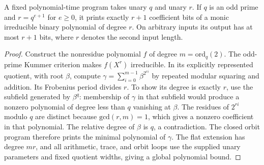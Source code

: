 \begin{lemma}
\label{lem:binary-odd-prime-power-irreducible}
\leanok
A fixed polynomial-time program takes unary $q$ and unary $r$. If $q$ is an odd
prime and $r=q^{e+1}$ for $e\geq 0$, it prints exactly $r+1$ coefficient bits
of a monic irreducible binary polynomial of degree $r$. On arbitrary inputs its
output has at most $r+1$ bits, where $r$ denotes the second input length.
\end{lemma}
\begin{proof}
\leanok
Construct the nonresidue polynomial $f$ of degree $m=\mathrm{ord}_q(2)$.
The odd-prime Kummer criterion makes $f(X^r)$ irreducible. In its explicitly
represented quotient, with root $\beta$, compute
$\gamma=\sum_{i=0}^{m-1}\beta^{2^{ri}}$ by repeated modular squaring and addition.
Its Frobenius period divides $r$. To show its degree is exactly $r$, use the
subfield generated by $\beta^q$: membership of $\gamma$ in that subfield would
produce a nonzero polynomial of degree less than $q$ vanishing at $\beta$.
The residues of $2^{ri}$ modulo $q$ are distinct because $\mathrm{gcd}(r,m)=1$, which gives a
nonzero coefficient in that polynomial. The relative degree of $\beta$ is $q$,
a contradiction. The closed orbit program therefore prints the minimal
polynomial of $\gamma$. The flat extension has degree $mr$, and all arithmetic,
trace, and orbit loops use the supplied unary parameters and fixed quotient
widths, giving a global polynomial bound.
\end{proof}

